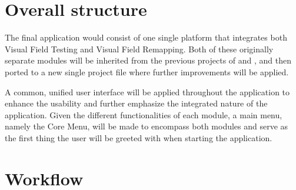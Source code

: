 \documentclass{l4proj}
\begin{document}
\section{Overall structure}
The final application would consist of one single platform that integrates both Visual Field Testing and Visual Field Remapping. Both of these originally separate modules will be inherited from the previous projects of \cite{Macintosh2024} and \cite{Russell2023}, and then ported to a new single project file where further improvements will be applied. 

A common, unified user interface will be applied throughout the application to enhance the usability and further emphasize the integrated nature of the application. Given the different functionalities of each module, a main menu, namely the Core Menu, will be made to encompass both modules and serve as the first thing the user will be greeted with when starting the application.


\section{Workflow}
\end{document}
